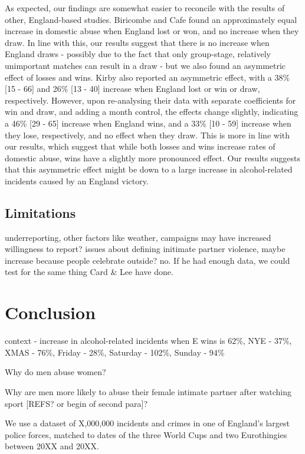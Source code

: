 \documentclass[12pt, letterpaper]{article}
\begin{document}
As expected, our findings are somewhat easier to reconcile with the results of other, England-based studies. Biricombe and Cafe found an approximately equal increase in domestic abuse when England lost or won, and no increase when they draw. In line with this, our results suggest that there is no increase when England draws - possibly due to the fact that only group-stage, relatively unimportant matches can result in a draw - but we also found an asymmetric effect of losses and wins. Kirby also reported an asymmetric effect, with a 38\% [15 - 66] and 26\% [13 - 40] increase when England lost or win or draw, respectively. However, upon re-analysing their data with separate coefficients for win and draw, and adding a month control, the effects change slightly, indicating a 46\% [29 - 65] increase when England wins, and a 33\% [10 - 59] increase when they lose, respectively, and no effect when they draw. This is more in line with our results, which suggest that while both losses and wins increase rates of domestic abuse, wins have a slightly more pronounced effect. Our results suggests that this asymmetric effect might be down to a large increase in alcohol-related incidents caused by an England victory.




\subsection{Limitations}
underreporting, other factors like weather, campaigns may have increased willingness to report? issues about defining initimate partner violence, maybe increase because people celebrate outside? no.
If he had enough data, we could test for the same thing Card \& Lee have done.

\section{Conclusion}

context - increase in alcohol-related incidents when E wins is 62\%, NYE - 37\%, XMAS - 76\%, Friday - 28\%, Saturday - 102\%, Sunday - 94\%



Why do men abuse women?


Why are men more likely to abuse their female intimate partner after watching sport [REFS? or begin of second para]?

We use a dataset of X,000,000 incidents and crimes in one of England's largest police forces, matched to dates of the three World Cups and two Eurothingies between 20XX and 20XX.
\end{document}
